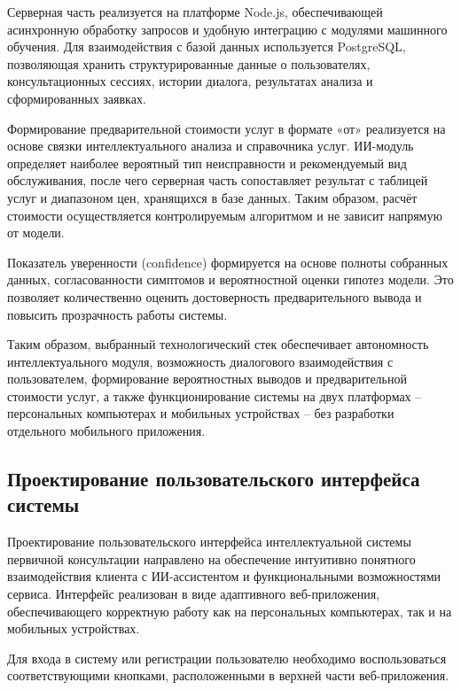 \documentclass[14pt,a4paper]{extarticle}
\numberwithin{figure}{section}
\numberwithin{table}{section}
\begin{document}
Серверная часть реализуется на платформе Node.js, обеспечивающей
асинхронную обработку запросов и удобную интеграцию с модулями машинного
обучения. Для взаимодействия с базой данных используется PostgreSQL,
позволяющая хранить структурированные данные о пользователях,
консультационных сессиях, истории диалога, результатах анализа и
сформированных заявках.

Формирование предварительной стоимости услуг в формате «от» реализуется
на основе связки интеллектуального анализа и справочника услуг.
ИИ-модуль определяет наиболее вероятный тип неисправности и
рекомендуемый вид обслуживания, после чего серверная часть сопоставляет
результат с таблицей услуг и диапазоном цен, хранящихся в базе данных.
Таким образом, расчёт стоимости осуществляется контролируемым алгоритмом
и не зависит напрямую от модели.

Показатель уверенности (confidence) формируется на основе полноты
собранных данных, согласованности симптомов и вероятностной оценки
гипотез модели. Это позволяет количественно оценить достоверность
предварительного вывода и повысить прозрачность работы системы.

Таким образом, выбранный технологический стек обеспечивает автономность
интеллектуального модуля, возможность диалогового взаимодействия с
пользователем, формирование вероятностных выводов и предварительной
стоимости услуг, а также функционирование системы на двух платформах --
персональных компьютерах и мобильных устройствах -- без разработки
отдельного мобильного приложения.

\subsection{Проектирование пользовательского интерфейса
системы}\label{ux43fux440ux43eux435ux43aux442ux438ux440ux43eux432ux430ux43dux438ux435-ux43fux43eux43bux44cux437ux43eux432ux430ux442ux435ux43bux44cux441ux43aux43eux433ux43e-ux438ux43dux442ux435ux440ux444ux435ux439ux441ux430-ux441ux438ux441ux442ux435ux43cux44b}

Проектирование пользовательского интерфейса интеллектуальной системы
первичной консультации направлено на обеспечение интуитивно понятного
взаимодействия клиента с ИИ-ассистентом и функциональными возможностями
сервиса. Интерфейс реализован в виде адаптивного веб-приложения,
обеспечивающего корректную работу как на персональных компьютерах, так и
на мобильных устройствах.

Для входа в систему или регистрации пользователю необходимо
воспользоваться соответствующими кнопками, расположенными в верхней
части веб-приложения.
\end{document}
